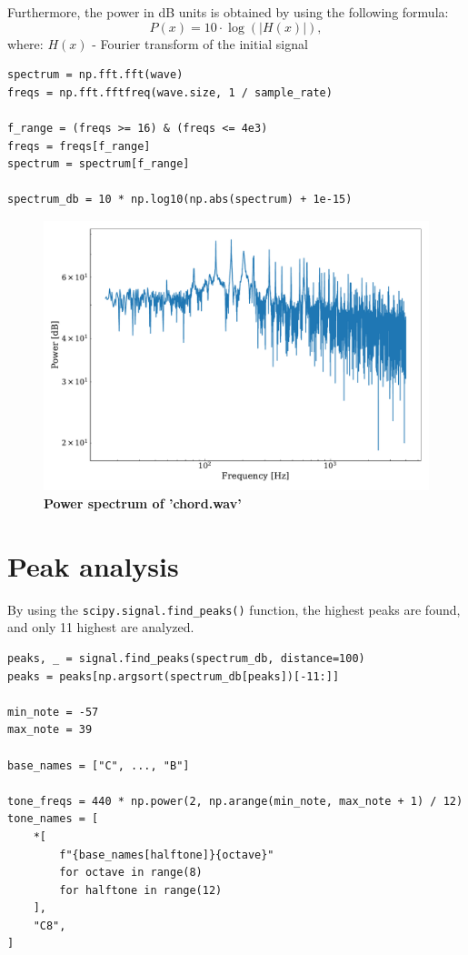 \documentclass[13pt,a4paper]{article}
\begin{document}
Furthermore, the power in dB units is obtained by using the following formula:
$$
P(x) = 10 \cdot \log(|H(x)|),
$$
where: $H(x)$ - Fourier transform of the initial signal

\begin{lstlisting}
spectrum = np.fft.fft(wave)
freqs = np.fft.fftfreq(wave.size, 1 / sample_rate)

f_range = (freqs >= 16) & (freqs <= 4e3)
freqs = freqs[f_range]
spectrum = spectrum[f_range]

spectrum_db = 10 * np.log10(np.abs(spectrum) + 1e-15)
\end{lstlisting}

\begin{figure}[ht!]
    \centering
    \caption{\textbf{Power spectrum of 'chord.wav'}}
    \includegraphics[width=1\textwidth]{fourier.pdf}
\end{figure}


\section{Peak analysis}
By using the \verb|scipy.signal.find_peaks()| function, the highest peaks are found, and only 11 highest are analyzed.

\begin{lstlisting}[caption={\textbf{Code snippet for identifying the semitones, based on the provided MATHLAB code.}}]
peaks, _ = signal.find_peaks(spectrum_db, distance=100)
peaks = peaks[np.argsort(spectrum_db[peaks])[-11:]]

min_note = -57
max_note = 39

base_names = ["C", ..., "B"]

tone_freqs = 440 * np.power(2, np.arange(min_note, max_note + 1) / 12)
tone_names = [
    *[
        f"{base_names[halftone]}{octave}"
        for octave in range(8)
        for halftone in range(12)
    ],
    "C8",
]
\end{lstlisting}
\end{document}

